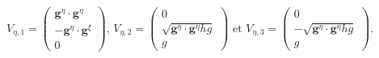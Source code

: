 \begin{equation*}
V_{\eta,1} = \begin{pmatrix}
\mathbf{g}^{\eta} \cdot \mathbf{g}^{\eta} \\
- \mathbf{g}^{\eta} \cdot \mathbf{g}^{\xi} \\
0
\end{pmatrix}\text{, }
V_{\eta,2} = \begin{pmatrix}
0 \\
\sqrt{\mathbf{g}^{\eta} \cdot \mathbf{g}^{\eta} h g}\\
g
\end{pmatrix}\text{ et }
V_{\eta,3} = \begin{pmatrix}
0 \\
-\sqrt{\mathbf{g}^{\eta} \cdot \mathbf{g}^{\eta} h g}\\
g
\end{pmatrix}.
\end{equation*}

